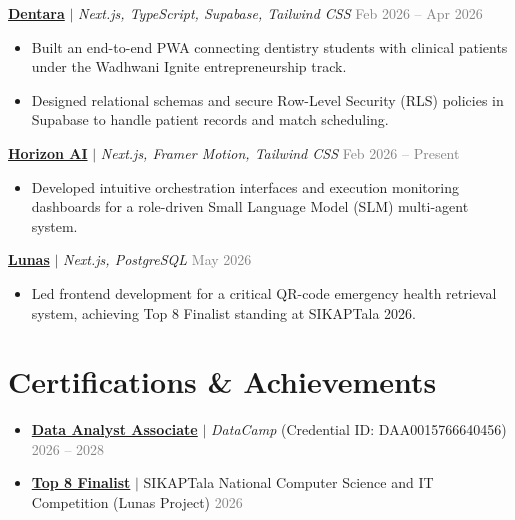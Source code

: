 \documentclass[a4paper,10pt]{article}
\begin{document}
\textbf{\href{https://dentara.vercel.app/}{Dentara}} $|$ \textit{Next.js, TypeScript, Supabase, Tailwind CSS} \hfill \textcolor{gray}{Feb 2026 -- Apr 2026}
\begin{itemize}
    \item Built an end-to-end PWA connecting dentistry students with clinical patients under the Wadhwani Ignite entrepreneurship track.
    \item Designed relational schemas and secure Row-Level Security (RLS) policies in Supabase to handle patient records and match scheduling.
\end{itemize}

\textbf{\href{https://horizonai-zeta.vercel.app/}{Horizon AI}} $|$ \textit{Next.js, Framer Motion, Tailwind CSS} \hfill \textcolor{gray}{Feb 2026 -- Present}
\begin{itemize}
    \item Developed intuitive orchestration interfaces and execution monitoring dashboards for a role-driven Small Language Model (SLM) multi-agent system.
\end{itemize}

\textbf{\href{https://lunas.software/}{Lunas}} $|$ \textit{Next.js, PostgreSQL} \hfill \textcolor{gray}{May 2026}
\begin{itemize}
    \item Led frontend development for a critical QR-code emergency health retrieval system, achieving Top 8 Finalist standing at SIKAPTala 2026.
\end{itemize}

\section{Certifications \& Achievements}
\begin{itemize}
    \item \textbf{\href{https://www.datacamp.com/certificate/DAA0015766640456}{Data Analyst Associate}} $|$ \textit{DataCamp} (Credential ID: DAA0015766640456) \hfill \textcolor{gray}{2026 -- 2028}
    \item \textbf{\href{https://www.facebook.com/share/p/1PTgEt6o6A/}{Top 8 Finalist}} $|$ SIKAPTala National Computer Science and IT Competition (Lunas Project) \hfill \textcolor{gray}{2026}
\end{itemize}
\end{document}
